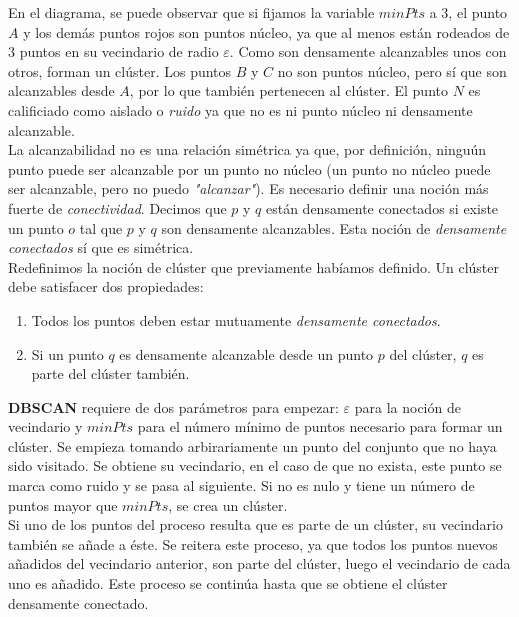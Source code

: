 \documentclass[a4paper, 12pt]{article}
\begin{document}
En el diagrama, se puede observar que si fijamos la variable $minPts$ a 3, el punto $A$ y los dem\'as puntos rojos son puntos n\'ucleo, ya que al menos est\'an rodeados de $3$ puntos en su vecindario de radio $\varepsilon$. Como son densamente alcanzables unos con otros, forman un cl\'uster. Los puntos $B$ y $C$ no son puntos n\'ucleo, pero s\'i que son alcanzables desde $A$, por lo que tambi\'en pertenecen al cl\'uster. El punto $N$ es calificiado como aislado o \textit{ruido} ya que no es ni punto n\'ucleo ni densamente alcanzable. \\

La alcanzabilidad no es una relaci\'on sim\'etrica ya que, por definici\'on, ningu\'un punto puede ser alcanzable por un punto no n\'ucleo (un punto no n\'ucleo puede ser alcanzable, pero no puedo \textit{"alcanzar"}). Es necesario definir una noci\'on m\'as fuerte de \textit{conectividad}. Decimos que $p$ y $q$ est\'an densamente conectados si existe un punto $o$ tal que $p$ y $q$ son densamente alcanzables. Esta noci\'on de \textit{densamente conectados} s\'i que es sim\'etrica.\\

Redefinimos la noci\'on de cl\'uster que previamente hab\'iamos definido. Un cl\'uster debe satisfacer dos propiedades:\\

\begin{enumerate}
	\item Todos los puntos deben estar mutuamente \textit{densamente conectados}.
	\item Si un punto $q$ es densamente alcanzable desde un punto $p$ del cl\'uster, $q$ es parte del cl\'uster tambi\'en. 
\end{enumerate}

\textbf{DBSCAN} requiere de dos par\'ametros para empezar: $\varepsilon$ para la noci\'on de vecindario y $minPts$ para el n\'umero m\'inimo de puntos necesario para formar un cl\'uster. Se empieza tomando arbirariamente un punto del conjunto que no haya sido visitado. Se obtiene su vecindario, en el caso de que no exista, este punto se marca como ruido y se pasa al siguiente. Si no es nulo y tiene un n\'umero de puntos mayor que $minPts$, se crea un cl\'uster. \\

Si uno de los puntos del proceso resulta que es parte de un cl\'uster, su vecindario tambi\'en se a\~nade a \'este. Se reitera este proceso, ya que todos los puntos nuevos a\~nadidos del vecindario anterior, son parte del cl\'uster, luego el vecindario de cada uno es a\~nadido. Este proceso se contin\'ua hasta que se obtiene el cl\'uster densamente conectado. \\
\end{document}
